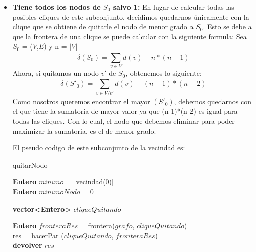 \begin{itemize}
\item \textbf{Tiene todos los nodos de $S_{0}$ salvo 1:} \newline En lugar de calcular todas las posibles cliques de este subconjunto, decidimos quedarnos únicamente con la clique que se obtiene de quitarle el nodo de menor grado a $S_{0}$. Esto se debe a que la frontera de una clique se puede calcular con la siguiente formula:\newline
Sea $S_{0}$ = ($V$,$E$) y n = $|$$V$$|$
\begin{equation}
  \delta(S_{0}) = \sum_{v \in V}^{} d(v) - n*(n-1)
\end{equation}
Ahora, si quitamos un nodo $v'$ de $S_{0}$, obtenemos lo siguiente:
\begin{equation}
  \delta(S'_{0}) = \sum_{v \in V/v'}^{} d(v) - (n-1)*(n-2)
\end{equation}
Como nosotros queremos encontrar el mayor \delta$(S'_{0})$, debemos quedarnos con el que tiene la sumatoria de mayor valor ya que (n-1)*(n-2) es igual para todas las cliques. Con lo cual, el nodo que debemos eliminar para poder maximizar la sumatoria, es el de menor grado.

El pseudo codigo de este subconjunto de la vecindad es:
\begin{algorithm}[H]
    \SetAlgoLined
    \caption{quitarNodo}
	
    \textbf{Entero} $minimo$ = $|$vecindad(0)$|$ \\	
    \textbf{Entero} $minimoNodo$ = 0 \\
    
    \textbf{vector<Entero>} $cliqueQuitando$\\

    
    \textbf{Entero} $fronteraRes$ = frontera($grafo$, $cliqueQuitando$)\\
    res = hacerPar ($cliqueQuitando$, $fronteraRes$)\\
    \textbf{devolver} $res$ \\
\end{algorithm}


\end{itemize}

